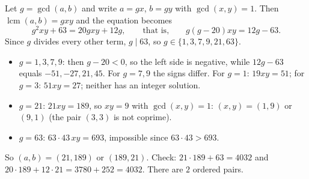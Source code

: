 Let $g=\gcd(a,b)$ and write $a=gx$, $b=gy$ with $\gcd(x,y)=1$. Then $\operatorname{lcm}(a,b)=gxy$ and the equation becomes
\[g^2xy+63=20gxy+12g,\qquad\text{that is,}\qquad g(g-20)xy=12g-63 .\]
Since $g$ divides every other term, $g\mid63$, so $g\in\{1,3,7,9,21,63\}$.
\begin{itemize}
\item $g=1,3,7,9$: then $g-20<0$, so the left side is negative, while $12g-63$ equals $-51,-27,21,45$. For $g=7,9$ the signs differ. For $g=1$: $19xy=51$; for $g=3$: $51xy=27$; neither has an integer solution.
\item $g=21$: $21xy=189$, so $xy=9$ with $\gcd(x,y)=1$: $(x,y)=(1,9)$ or $(9,1)$ (the pair $(3,3)$ is not coprime).
\item $g=63$: $63\cdot43\,xy=693$, impossible since $63\cdot43>693$.
\end{itemize}
So $(a,b)=(21,189)$ or $(189,21)$. Check: $21\cdot189+63=4032$ and $20\cdot189+12\cdot21=3780+252=4032$. There are $\boxed{2}$ ordered pairs.
